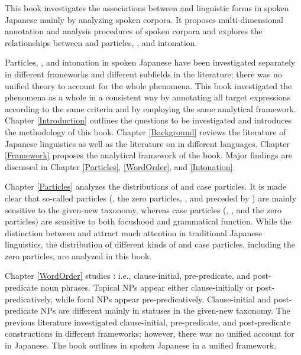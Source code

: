 \label{Abstract}
\begin{refsection}

This book investigates the associations between 
and linguistic forms in spoken Japanese
mainly by analyzing spoken corpora.
It proposes multi-dimensional annotation and analysis procedures of spoken corpora and
explores the relationships between 
and particles, , and intonation.

Particles, , and intonation in spoken Japanese have been investigated separately in different frameworks and different subfields in the literature;
there was no unified theory to account for the whole phenomena.
This book investigated the phenomena as a whole in a consistent way
by annotating all target expressions according to the same criteria and
by employing the same analytical framework.
Chapter \ref{Introduction} outlines the questions to be investigated and introduces the methodology of this book.
Chapter \ref{Background} reviews the literature of Japanese linguistics
as well as the literature on  in different languages.
Chapter \ref{Framework} proposes the analytical framework of the book.
Major findings are discussed in Chapter \ref{Particles}, \ref{WordOrder}, and \ref{Intonation}.

Chapter \ref{Particles} analyzes the distributions of  and case particles.
It is made clear that so-called  particles 
(, the zero particles, , and  preceded by ) are mainly sensitive to the given-new taxonomy,
whereas case particles (, , and the zero particles) are sensitive to both focushood and grammatical function.
While the distinction between  and  attract much attention in traditional Japanese linguistics,
the distribution of different kinds of  and case particles, including the zero particles,
are analyzed in this book.

Chapter \ref{WordOrder} studies :
i.e., clause-initial, pre-predicate, and post-pred\-i\-cate noun phrases.%
Topical NPs appear either clause-initially or post-pred\-i\-cat\-ively,
while focal NPs appear pre-predicatively.
Clause-initial and post-predicate NPs are different mainly in statuses in the given-new taxonomy.
The previous literature investigated clause-initial, pre-predicate, and post-predicate constructions in different frameworks;
however, there was no unified account for  in Japanese.
The book outlines  in spoken Japanese in a unified framework.


\end{refsection}
